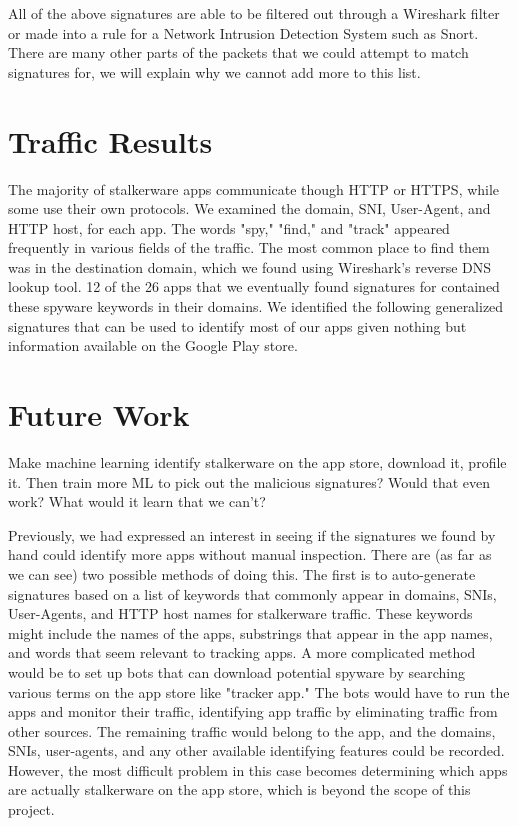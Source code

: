 \documentclass[acmtog]{acmart}
\begin{document}
All of the above signatures are able to be filtered out through a Wireshark filter or made into a rule for a Network Intrusion Detection System such as Snort. There are many other parts of the packets that we could attempt to match signatures for, we will explain why we cannot add more to this list.
\section{Traffic Results}

The majority of stalkerware apps communicate though HTTP or HTTPS, while some 
use their own protocols. We examined the domain, SNI, User-Agent, and HTTP 
host, for each app. The words "spy," "find," and "track" appeared frequently in 
various fields of the traffic. The most common place to find them was in the 
destination domain, which we found using Wireshark's reverse DNS lookup tool. 
12 of the 26 apps that we eventually found signatures for contained these 
spyware keywords in their domains. We identified the following generalized 
signatures that can be used to identify most of our apps given nothing but 
information available on the Google Play store.


\section{Future Work}

Make machine learning identify stalkerware on the app store, download it, 
profile it. Then train more ML to pick out the malicious signatures? Would that 
even work? What would it learn that we can't?

Previously, we had expressed an interest in seeing if the signatures we found 
by hand could identify more apps without manual inspection. There are (as far 
as we can see) two possible methods of doing this. The first is to 
auto-generate signatures based on a list of keywords that commonly appear in 
domains, SNIs, User-Agents, and HTTP host names for stalkerware traffic. These 
keywords might include the names of the apps, substrings that appear in the app 
names, and words that seem relevant to tracking apps. A more complicated method 
would be to set up bots that can download potential spyware by searching 
various terms on the app store like "tracker app." The bots would have to run 
the apps and monitor their traffic, identifying app traffic by eliminating 
traffic from other sources. The remaining traffic would belong to the app, and 
the domains, SNIs, user-agents, and any other available identifying features 
could be recorded. However, the most difficult problem in this case becomes 
determining which apps are actually stalkerware on the app store, which is 
beyond the scope of this project. 
\end{document}
